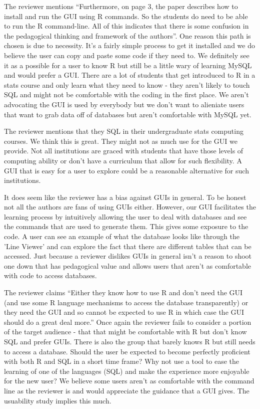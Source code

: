 \documentclass[11pt]{tise_style}
\begin{document}
The reviewer mentions ``Furthermore, on page 3, the paper describes how to install and run the GUI using R commands.  So the students do need to be able to run the R command-line.  All of this indicates that there is some confusion in the pedagogical thinking and framework of the authors''.  One reason this path is chosen is due to necessity.  It's a fairly simple process to get it installed and we do believe the user can copy and paste some code if they need to.  We definitely see it as a possible for a user to know R but still be a little wary of learning MySQL and would prefer a GUI.  There are a lot of students that get introduced to R in a stats course and only learn what they need to know - they aren't likely to touch SQL and might not be comfortable with the coding in the first place.  We aren't advocating the GUI is used by everybody but we don't want to alieniate users that want to grab data off of databases but aren't comfortable with MySQL yet.

The reviewer mentions that they SQL in their undergraduate stats computing courses.  We think this is great.  They might not as much use for the GUI we provide.  Not all institutions are graced with students that have those levels of computing ability or don't have a curriculum that allow for such flexibility.  A GUI that is easy for a user to explore could be a reasonable alternative for such institutions.

It does seem like the reviewer has a bias against GUIs in general.  To be honest not all the authors are fans of using GUIs either.  However, our GUI facilitates the learning process by intuitively allowing the user to deal with databases and see the commands that are used to generate them.  This gives some exposure to the code.  A user can see an example of what the database looks like through the 'Line Viewer' and can explore the fact that there are different tables that can be accessed.  Just because a reviewer dislikes GUIs in general isn't a reason to shoot one down that has pedagogical value and allows users that aren't as comfortable with code to access databases.

The reviewer claims ``Either they know how to use R and don't need the GUI (and use some R language mechanisms to access the database transparently) or they need the GUI and so cannot be expected to use R in which case the GUI should do a great deal more.''  Once again the reviewer fails to consider a portion of the target audience - that that might be comfortable with R but don't know SQL and prefer GUIs.  There is also the group that barely knows R but still needs to access a database.  Should the user be expected to become perfectly proficient with both R and SQL in a short time frame?  Why not use a tool to ease the learning of one of the languages (SQL) and make the experience more enjoyable for the new user?  We believe some users aren't as comfortable with the command line as the reviewer is and would appreciate the guidance that a GUI gives.  The usuability study implies this much.
\end{document}
